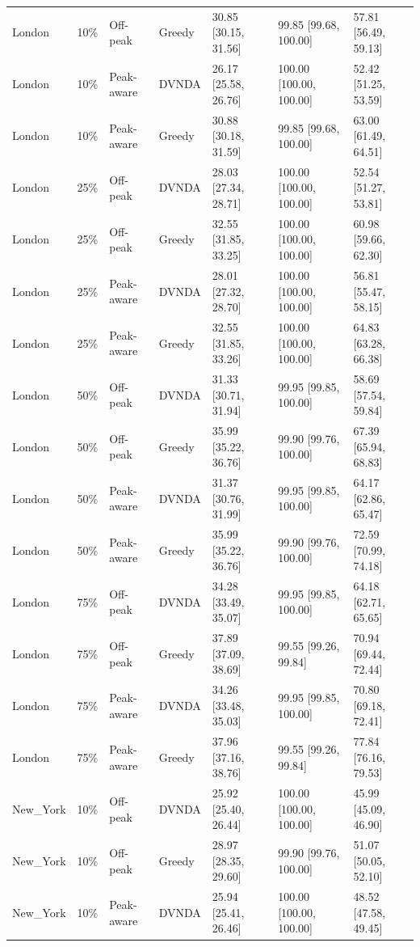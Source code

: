 \begin{tabular}{lllllll}
London & 10\% & Off-peak & Greedy & 30.85 [30.15, 31.56] & 99.85 [99.68, 100.00] & 57.81 [56.49, 59.13] \\
London & 10\% & Peak-aware & DVNDA & 26.17 [25.58, 26.76] & 100.00 [100.00, 100.00] & 52.42 [51.25, 53.59] \\
London & 10\% & Peak-aware & Greedy & 30.88 [30.18, 31.59] & 99.85 [99.68, 100.00] & 63.00 [61.49, 64.51] \\
London & 25\% & Off-peak & DVNDA & 28.03 [27.34, 28.71] & 100.00 [100.00, 100.00] & 52.54 [51.27, 53.81] \\
London & 25\% & Off-peak & Greedy & 32.55 [31.85, 33.25] & 100.00 [100.00, 100.00] & 60.98 [59.66, 62.30] \\
London & 25\% & Peak-aware & DVNDA & 28.01 [27.32, 28.70] & 100.00 [100.00, 100.00] & 56.81 [55.47, 58.15] \\
London & 25\% & Peak-aware & Greedy & 32.55 [31.85, 33.26] & 100.00 [100.00, 100.00] & 64.83 [63.28, 66.38] \\
London & 50\% & Off-peak & DVNDA & 31.33 [30.71, 31.94] & 99.95 [99.85, 100.00] & 58.69 [57.54, 59.84] \\
London & 50\% & Off-peak & Greedy & 35.99 [35.22, 36.76] & 99.90 [99.76, 100.00] & 67.39 [65.94, 68.83] \\
London & 50\% & Peak-aware & DVNDA & 31.37 [30.76, 31.99] & 99.95 [99.85, 100.00] & 64.17 [62.86, 65.47] \\
London & 50\% & Peak-aware & Greedy & 35.99 [35.22, 36.76] & 99.90 [99.76, 100.00] & 72.59 [70.99, 74.18] \\
London & 75\% & Off-peak & DVNDA & 34.28 [33.49, 35.07] & 99.95 [99.85, 100.00] & 64.18 [62.71, 65.65] \\
London & 75\% & Off-peak & Greedy & 37.89 [37.09, 38.69] & 99.55 [99.26, 99.84] & 70.94 [69.44, 72.44] \\
London & 75\% & Peak-aware & DVNDA & 34.26 [33.48, 35.03] & 99.95 [99.85, 100.00] & 70.80 [69.18, 72.41] \\
London & 75\% & Peak-aware & Greedy & 37.96 [37.16, 38.76] & 99.55 [99.26, 99.84] & 77.84 [76.16, 79.53] \\
New\_York & 10\% & Off-peak & DVNDA & 25.92 [25.40, 26.44] & 100.00 [100.00, 100.00] & 45.99 [45.09, 46.90] \\
New\_York & 10\% & Off-peak & Greedy & 28.97 [28.35, 29.60] & 99.90 [99.76, 100.00] & 51.07 [50.05, 52.10] \\
New\_York & 10\% & Peak-aware & DVNDA & 25.94 [25.41, 26.46] & 100.00 [100.00, 100.00] & 48.52 [47.58, 49.45] \\

\end{tabular}
